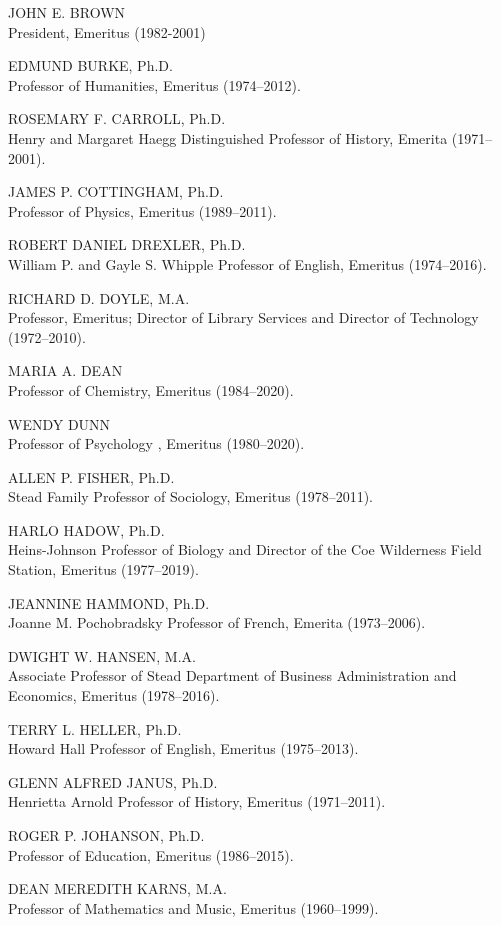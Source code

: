 \documentclass[
  letterpaper,
]{scrbook}
\begin{document}
JOHN E. BROWN\\
President, Emeritus (1982-2001)

EDMUND BURKE, Ph.D.\\
Professor of Humanities, Emeritus (1974--2012).

ROSEMARY F. CARROLL, Ph.D.\\
Henry and Margaret Haegg Distinguished Professor of History, Emerita
(1971--2001).

JAMES P. COTTINGHAM, Ph.D.\\
Professor of Physics, Emeritus (1989--2011).

ROBERT DANIEL DREXLER, Ph.D.\\
William P. and Gayle S. Whipple Professor of English, Emeritus
(1974--2016).

RICHARD D. DOYLE, M.A.\\
Professor, Emeritus; Director of Library Services and Director of
Technology (1972--2010).

MARIA A. DEAN\\
Professor of Chemistry, Emeritus (1984--2020).

WENDY DUNN\\
Professor of Psychology , Emeritus (1980--2020).

ALLEN P. FISHER, Ph.D.\\
Stead Family Professor of Sociology, Emeritus (1978--2011).

HARLO HADOW, Ph.D.\\
Heins-Johnson Professor of Biology and Director of the Coe Wilderness
Field Station, Emeritus (1977--2019).

JEANNINE HAMMOND, Ph.D.\\
Joanne M. Pochobradsky Professor of French, Emerita (1973--2006).

DWIGHT W. HANSEN, M.A.\\
Associate Professor of Stead Department of Business Administration and
Economics, Emeritus (1978--2016).

TERRY L. HELLER, Ph.D.\\
Howard Hall Professor of English, Emeritus (1975--2013).

GLENN ALFRED JANUS, Ph.D.\\
Henrietta Arnold Professor of History, Emeritus (1971--2011).

ROGER P. JOHANSON, Ph.D.\\
Professor of Education, Emeritus (1986--2015).

DEAN MEREDITH KARNS, M.A.\\
Professor of Mathematics and Music, Emeritus (1960--1999).
\end{document}
